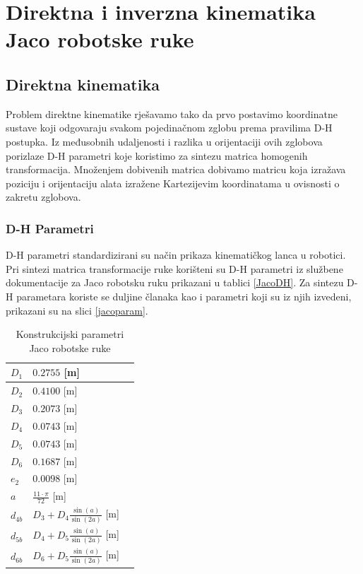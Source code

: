 \documentclass[times, utf8, diplomski, numeric]{fer}
\begin{document}
\section{Direktna i inverzna kinematika Jaco robotske ruke}\label{direkt i inverz}
\subsection{Direktna kinematika}
Problem direktne kinematike rješavamo tako da prvo postavimo koordinatne sustave koji odgovaraju svakom pojedinačnom zglobu prema pravilima D-H postupka.
Iz međusobnih udaljenosti i razlika u orijentaciji ovih zglobova porizlaze D-H parametri koje koristimo za sintezu matrica homogenih transformacija.
Množenjem dobivenih matrica dobivamo matricu koja izražava poziciju i orijentaciju alata izražene Kartezijevim koordinatama u ovisnosti o zakretu zglobova.
 
\subsubsection{D-H Parametri}
D-H parametri standardizirani su način prikaza kinematičkog lanca u robotici.
Pri sintezi matrica transformacije ruke korišteni su D-H parametri iz službene dokumentacije za Jaco robotsku ruku prikazani u tablici \ref{JacoDH}. 
Za sintezu D-H parametara koriste se duljine članaka kao i parametri koji su iz njih izvedeni, prikazani su na slici \ref{jacoparam}.

\begin{table}[h!]
    \centering
    \begin{tabular}{ | l | l | l |}
    \hline
    $D_{1}$ & $0.2755$ [m] \\ \hline
    $D_{2}$  & $0.4100$ [m] \\ \hline
    $D_{3}$  & $0.2073$ [m] \\ \hline
    $D_{4}$  & $0.0743$ [m] \\ \hline
    $D_{5}$  & $0.0743$ [m] \\ \hline
    $D_{6}$  & $0.1687$ [m] \\ \hline
    $e_{2}$  & $0.0098$ [m] \\ \hline
    $a$  & $\frac{11\cdot\pi}{72}$ [m] \\ \hline
    $d_{4b}$  & $D_{3}+D_{4}\frac{\sin(a)}{\sin(2a)}$ [m] \\ \hline
    $d_{5b}$  & $D_{4}+D_{5}\frac{\sin(a)}{\sin(2a)}$ [m] \\ \hline
    $d_{6b}$  & $D_{6}+D_{5}\frac{\sin(a)}{\sin(2a)}$ [m] \\ \hline
    \end{tabular}
    \caption{Konstrukcijski parametri Jaco robotske ruke}
\end{table}
\end{document}
